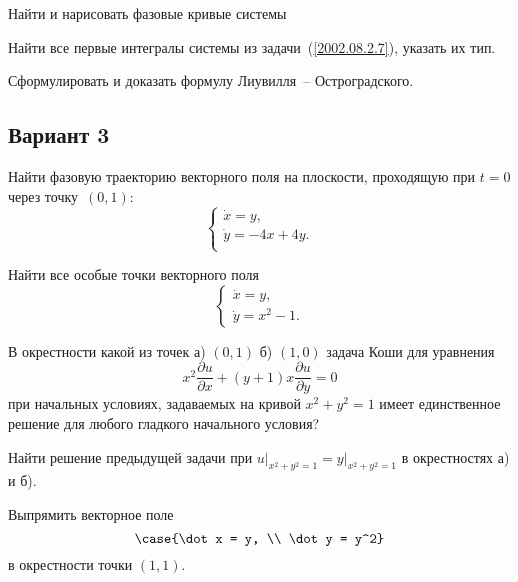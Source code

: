 \documentclass[a4paper]{article}
\begin{document}
\begin{problem}
Найти и нарисовать фазовые кривые системы
\end{problem}

\begin{problem}
Найти все первые интегралы системы из задачи~(\ref{2002.08.2.7}), указать их тип.
\end{problem}

\begin{problem}
Сформулировать и доказать формулу Лиувилля~-- Остроградского.
\end{problem}


\subsection{Вариант 3}

\begin{problem}
Найти фазовую траекторию векторного поля на плоскости, проходящую при $t=0$ через точку~$(0,1)$:
$$
\begin{cases}
\dot x = y,\\
\dot y = -4x + 4y.\\
\end{cases}
$$
\end{problem}

\begin{problem}
Найти все особые точки векторного поля
$$
\begin{cases}
\dot x = y,\\
\dot y = x^2 - 1.
\end{cases}
$$
\end{problem}

\begin{problem}
В окрестности какой из точек а) $(0,1)$  б) $(1,0)$ задача Коши для уравнения
$$
x^2\frac{\partial u}{\partial x} +(y+1)x\frac{\partial u}{\partial y} = 0
$$
при начальных условиях, задаваемых на кривой $x^2 + y^2=1$ имеет единственное решение для любого гладкого
начального условия?
\end{problem}

\begin{problem}
Найти решение предыдущей задачи при $u\rvert_{x^2 + y^2 =1} = y\rvert_{x^2 + y^2=1}$ в окрестностях а) и
б).
\end{problem}

\begin{problem}
Выпрямить векторное поле
$$\case{\dot x = y, \\ \dot y = y^2}$$
в окрестности точки $(1,1)$.
\end{problem}
\end{document}
